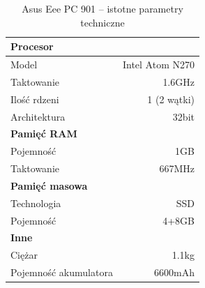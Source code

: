\begin{table}[h!]
\caption{Asus Eee PC 901 -- istotne parametry techniczne}
\centering
\small
\begin{tabular*}{0.6\textwidth}{@{\extracolsep{\fill}} lr}
\toprule
\textbf{Procesor}\\
\midrule
Model & Intel Atom N270\\
Taktowanie & 1.6GHz\\
Ilość rdzeni & 1 (2 wątki)\\
Architektura & 32bit \\
\midrule
\textbf{Pamięć RAM} \\
\midrule
Pojemność & 1GB \\
Taktowanie & 667MHz \\
\midrule
\textbf{Pamięć masowa} \\
\midrule
Technologia & SSD \\
Pojemność & 4+8GB \\
\midrule
\textbf{Inne} \\
\midrule
Ciężar & 1.1kg \\
Pojemność akumulatora & 6600mAh \\
\bottomrule
\end{tabular*}
\label{tab:eee_params}
\end{table}


